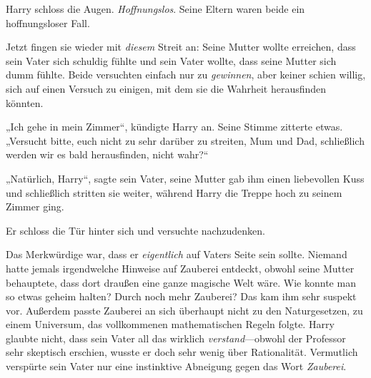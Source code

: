 Harry schloss die Augen. \emph{Hoffnungslos}. Seine Eltern waren beide ein hoffnungsloser Fall.

Jetzt fingen sie wieder mit \emph{diesem} Streit an: Seine Mutter wollte erreichen, dass sein Vater sich schuldig fühlte und sein Vater wollte, dass seine Mutter sich dumm fühlte. Beide versuchten einfach nur zu \emph{gewinnen}, aber keiner schien willig, sich auf einen Versuch zu einigen, mit dem sie die Wahrheit herausfinden könnten.

„Ich gehe in mein Zimmer“, kündigte Harry an. Seine Stimme zitterte etwas. „Versucht bitte, euch nicht zu sehr darüber zu streiten, Mum und Dad, schließlich werden wir es bald herausfinden, nicht wahr?“

„Natürlich, Harry“, sagte sein Vater, seine Mutter gab ihm einen liebevollen Kuss und schließlich stritten sie weiter, während Harry die Treppe hoch zu seinem Zimmer ging.

Er schloss die Tür hinter sich und versuchte nachzudenken.

Das Merkwürdige war, dass er \emph{eigentlich} auf Vaters Seite sein sollte. Niemand hatte jemals irgendwelche Hinweise auf Zauberei entdeckt, obwohl seine Mutter behauptete, dass dort draußen eine ganze magische Welt wäre. Wie konnte man so etwas geheim halten? Durch noch mehr Zauberei? Das kam ihm sehr suspekt vor. Außerdem passte Zauberei an sich überhaupt nicht zu den Naturgesetzen, zu einem Universum, das vollkommenen mathematischen Regeln folgte. Harry glaubte nicht, dass sein Vater all das wirklich \emph{verstand}—obwohl der Professor sehr skeptisch erschien, wusste er doch sehr wenig über Rationalität. Vermutlich verspürte sein Vater nur eine instinktive Abneigung gegen das Wort \emph{Zauberei}.

